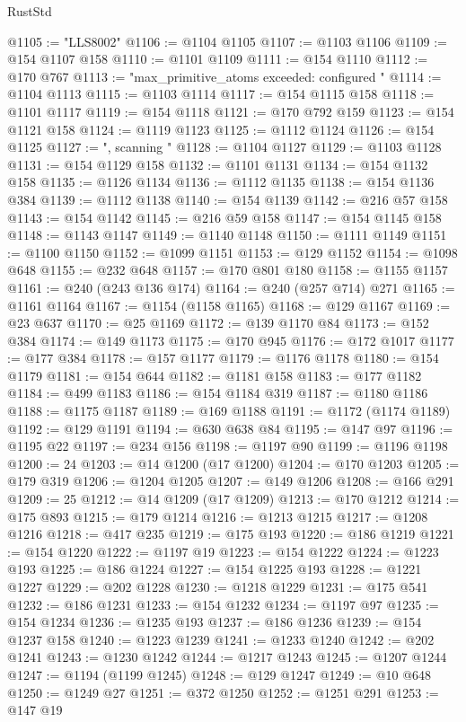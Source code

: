 \begin{lexlean}{RustStd}
\begin{coremodule}
@1105 := "LLS8002"
@1106 := @1104 @1105
@1107 := @1103 @1106
@1109 := @154 @1107 @158
@1110 := @1101 @1109
@1111 := @154 @1110
@1112 := @170 @767
@1113 := "max_primitive_atoms exceeded: configured "
@1114 := @1104 @1113
@1115 := @1103 @1114
@1117 := @154 @1115 @158
@1118 := @1101 @1117
@1119 := @154 @1118
@1121 := @170 @792 @159
@1123 := @154 @1121 @158
@1124 := @1119 @1123
@1125 := @1112 @1124
@1126 := @154 @1125
@1127 := ", scanning "
@1128 := @1104 @1127
@1129 := @1103 @1128
@1131 := @154 @1129 @158
@1132 := @1101 @1131
@1134 := @154 @1132 @158
@1135 := @1126 @1134
@1136 := @1112 @1135
@1138 := @154 @1136 @384
@1139 := @1112 @1138
@1140 := @154 @1139
@1142 := @216 @57 @158
@1143 := @154 @1142
@1145 := @216 @59 @158
@1147 := @154 @1145 @158
@1148 := @1143 @1147
@1149 := @1140 @1148
@1150 := @1111 @1149
@1151 := @1100 @1150
@1152 := @1099 @1151
@1153 := @129 @1152
@1154 := @1098 @648
@1155 := @232 @648
@1157 := @170 @801 @180
@1158 := @1155 @1157
@1161 := @240 (@243 @136 @174)
@1164 := @240 (@257 @714) @271
@1165 := @1161 @1164
@1167 := @1154 (@1158 @1165)
@1168 := @129 @1167
@1169 := @23 @637
@1170 := @25 @1169
@1172 := @139 @1170 @84
@1173 := @152 @384
@1174 := @149 @1173
@1175 := @170 @945
@1176 := @172 @1017
@1177 := @177 @384
@1178 := @157 @1177
@1179 := @1176 @1178
@1180 := @154 @1179
@1181 := @154 @644
@1182 := @1181 @158
@1183 := @177 @1182
@1184 := @499 @1183
@1186 := @154 @1184 @319
@1187 := @1180 @1186
@1188 := @1175 @1187
@1189 := @169 @1188
@1191 := @1172 (@1174 @1189)
@1192 := @129 @1191
@1194 := @630 @638 @84
@1195 := @147 @97
@1196 := @1195 @22
@1197 := @234 @156
@1198 := @1197 @90
@1199 := @1196 @1198
@1200 := 24
@1203 := @14 @1200 (@17 @1200)
@1204 := @170 @1203
@1205 := @179 @319
@1206 := @1204 @1205
@1207 := @149 @1206
@1208 := @166 @291
@1209 := 25
@1212 := @14 @1209 (@17 @1209)
@1213 := @170 @1212
@1214 := @175 @893
@1215 := @179 @1214
@1216 := @1213 @1215
@1217 := @1208 @1216
@1218 := @417 @235
@1219 := @175 @193
@1220 := @186 @1219
@1221 := @154 @1220
@1222 := @1197 @19
@1223 := @154 @1222
@1224 := @1223 @193
@1225 := @186 @1224
@1227 := @154 @1225 @193
@1228 := @1221 @1227
@1229 := @202 @1228
@1230 := @1218 @1229
@1231 := @175 @541
@1232 := @186 @1231
@1233 := @154 @1232
@1234 := @1197 @97
@1235 := @154 @1234
@1236 := @1235 @193
@1237 := @186 @1236
@1239 := @154 @1237 @158
@1240 := @1223 @1239
@1241 := @1233 @1240
@1242 := @202 @1241
@1243 := @1230 @1242
@1244 := @1217 @1243
@1245 := @1207 @1244
@1247 := @1194 (@1199 @1245)
@1248 := @129 @1247
@1249 := @10 @648
@1250 := @1249 @27
@1251 := @372 @1250
@1252 := @1251 @291
@1253 := @147 @19

\end{coremodule}
\end{lexlean}
